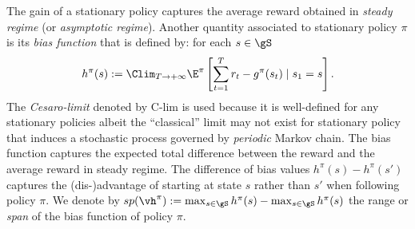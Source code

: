 The gain of a stationary policy captures the average reward obtained in \emph{steady regime} (or \emph{asymptotic regime}).
Another quantity associated to stationary policy $\pi$ is its \emph{bias function} that is defined by: for each $s\in\gS$
\begin{equation}
    \label{eq:bias_defn}
    h^\pi(s) :=\Clim_{T\to+\infty} \E^\pi\left[ \sum_{t=1}^{T} r_t -g^\pi(s_t) \mid s_1=s\right].
\end{equation}
The \emph{Cesaro-limit} denoted by $\mathrm{C}$-$\mathrm{lim}$ is used because it is well-defined for any stationary policies albeit the ``classical'' limit may not exist for stationary policy that induces a stochastic process governed by \emph{periodic} Markov chain.
The bias function captures the expected total difference between the reward and the average reward in steady regime. 
The difference of bias values $h^\pi(s)-h^\pi(s')$ captures the (dis-)advantage of starting at state $s$ rather than $s'$ when following policy $\pi$.
We denote by $sp(\vh^\pi):=\max_{s\in\gS}h^\pi(s) -\max_{s\in\gS}h^\pi(s)$ the range or \emph{span} of the bias function of policy $\pi$.

